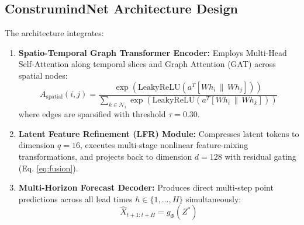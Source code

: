 \documentclass[11pt,a4paper]{article}
\begin{document}
\subsection{ConstrumindNet Architecture Design}
The architecture integrates:
\begin{enumerate}
\item \textbf{Spatio-Temporal Graph Transformer Encoder:} Employs Multi-Head Self-Attention along temporal slices and Graph Attention (GAT) across spatial nodes:
\begin{equation}
A_{\text{spatial}}(i, j) = \frac{\exp\left(\text{LeakyReLU}\left(a^T [W h_i \,\|\, W h_j]\right)\right)}{\sum_{k \in \mathcal{N}_i} \exp\left(\text{LeakyReLU}\left(a^T [W h_i \,\|\, W h_k]\right)\right)} \label{eq:gat}
\end{equation}
where edges are sparsified with threshold $\tau = 0.30$.
\item \textbf{Latent Feature Refinement (LFR) Module:} Compresses latent tokens to dimension $q = 16$, executes multi-stage nonlinear feature-mixing transformations, and projects back to dimension $d = 128$ with residual gating (Eq. \ref{eq:fusion}).
\item \textbf{Multi-Horizon Forecast Decoder:} Produces direct multi-step point predictions across all lead times $h \in \{1, \dots, H\}$ simultaneously:
\begin{equation}
\widehat{X}_{t+1:t+H} = g_\Phi(Z^*) \label{eq:decoder}
\end{equation}
\end{enumerate}
\end{document}
